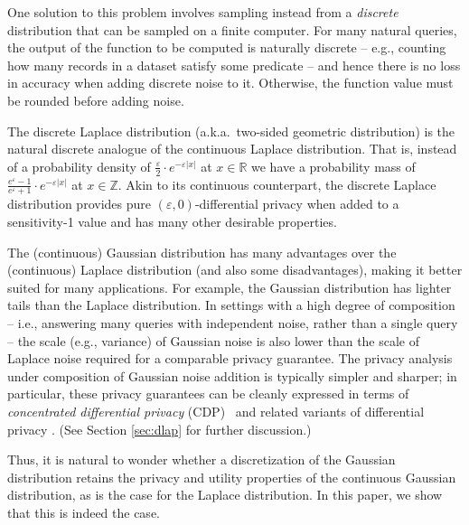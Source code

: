 \documentclass{jpc}
\newcommand{\eps}{\varepsilon}
\newcommand{\Z}{\mathbb{Z}}
\newcommand{\R}{\mathbb{R}}
\begin{document}
One solution to this problem involves sampling instead from a \emph{discrete} distribution that can be sampled on a finite computer. For many natural queries, the output of the function to be computed is naturally discrete -- e.g., counting how many records in a dataset satisfy some predicate -- and hence there is no loss in accuracy when adding discrete noise to it. Otherwise, the function value must be rounded before adding noise.

The discrete Laplace distribution (a.k.a.~two-sided geometric distribution) \citep{GhoshRS12,BalcerV17} is the natural discrete analogue of the continuous Laplace distribution. That is, instead of a probability density of $\frac{\eps}{2} \cdot e^{-\eps|x|}$ at $x \in \R$ we have a probability mass of $\frac{e^\eps-1}{e^\eps+1} \cdot e^{-\eps|x|}$ at $x \in \Z$. Akin to its continuous counterpart, the discrete Laplace distribution provides pure $(\eps,0)$-differential privacy when added to a sensitivity-1 value and has many other desirable properties. 

The (continuous) Gaussian distribution has many advantages over the (continuous) Laplace distribution (and also some disadvantages), making it better suited for many applications. For example, the Gaussian distribution has lighter tails than the Laplace distribution. In settings with a high degree of composition -- i.e., answering many queries with independent noise, rather than a single query -- the scale (e.g., variance) of Gaussian noise is also lower than the scale of Laplace noise required for a comparable privacy guarantee. The privacy analysis under composition of Gaussian noise addition is typically simpler and sharper; in particular, these privacy guarantees can be cleanly expressed in terms of \emph{concentrated differential privacy} (CDP)~\citep{DworkR16,BunS16} and related variants of differential privacy \citep{Mironov17,BunDRS18,DongRS19}. (See Section \ref{sec:dlap} for further discussion.)

Thus, it is natural to wonder whether a discretization of the Gaussian distribution retains the privacy and utility properties of the continuous Gaussian distribution, as is the case for the Laplace distribution. 
In this paper, we show that this is indeed the case. 
\end{document}
